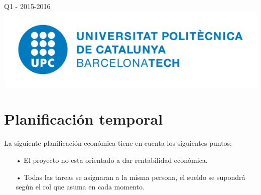 \documentclass[12pt]{article} %
\begin{document}
\begin{titlepage}

{\large Q1 - 2015-2016}\\[2cm] %


\includegraphics[scale=0.7]{add/logo_upc.png}\\[1cm] %
 

\vfill %

\end{titlepage}


\tableofcontents %

\newpage %

\section{Planificación temporal}
La siguiente planificación económica tiene en cuenta los siguientes puntos:
\begin{itemize}
\item[•]El proyecto no esta orientado a dar rentabilidad económica.
\item[•]Todas las tareas se asignaran a la misma persona, el sueldo se supondrá según el rol que asuma en cada momento. 
\end{itemize}
\end{document}

